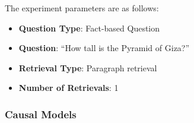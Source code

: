 \documentclass{wseas}
\begin{document}
The experiment parameters are as follows:

\begin{itemize}
\item
  \textbf{Question Type}: Fact-based Question
\item
  \textbf{Question}: ``How tall is the Pyramid of Giza?''
\item
  \textbf{Retrieval Type}: Paragraph retrieval
\item
  \textbf{Number of Retrievals}: 1
\end{itemize}

\subsubsection{Causal Models}

\end{document}
